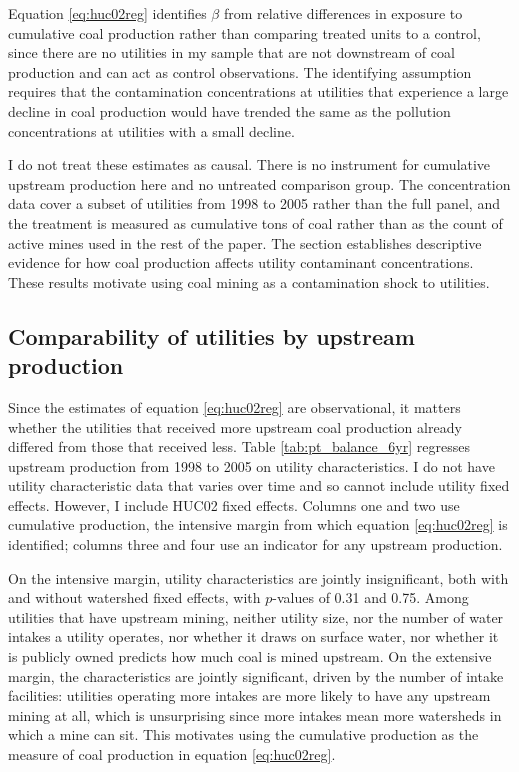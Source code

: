\documentclass[12pt]{article}
\begin{document}
Equation \ref{eq:huc02reg} identifies $\beta$ from relative differences in exposure to cumulative coal production rather than comparing treated units to a control, since there are no utilities in my sample that are not downstream of coal production and can act as control observations. The identifying assumption requires that the contamination concentrations at utilities that experience a large decline in coal production would have trended the same as the pollution concentrations at utilities with a small decline. %


I do not treat these estimates as causal. There is no instrument for cumulative upstream production here and no untreated comparison group. The concentration data cover a subset of utilities from 1998 to 2005 rather than the full panel, and the treatment is measured as cumulative tons of coal rather than as the count of active mines used in the rest of the paper. The section establishes descriptive evidence for how coal production affects utility contaminant concentrations. These results motivate using coal mining as a contamination shock to utilities.

\subsection{Comparability of utilities by upstream production}

Since the estimates of equation \ref{eq:huc02reg} are observational, it matters whether the utilities that received more upstream coal production already differed from those that received less. Table \ref{tab:pt_balance_6yr} regresses upstream production from 1998 to 2005 on utility characteristics. I do not have utility characteristic data that varies over time and so cannot include utility fixed effects. However, I include HUC02 fixed effects. Columns one and two use cumulative production, the intensive margin from which equation \ref{eq:huc02reg} is identified; columns three and four use an indicator for any upstream production.

On the intensive margin, utility characteristics are jointly insignificant, both with and without watershed fixed effects, with $p$-values of 0.31 and 0.75. Among utilities that have upstream mining, neither utility size, nor the number of water intakes a utility operates, nor whether it draws on surface water, nor whether it is publicly owned predicts how much coal is mined upstream. On the extensive margin, the characteristics are jointly significant, driven by the number of intake facilities: utilities operating more intakes are more likely to have any upstream mining at all, which is unsurprising since more intakes mean more watersheds in which a mine can sit. This motivates using the cumulative production as the measure of coal production in equation \ref{eq:huc02reg}.
\end{document}
